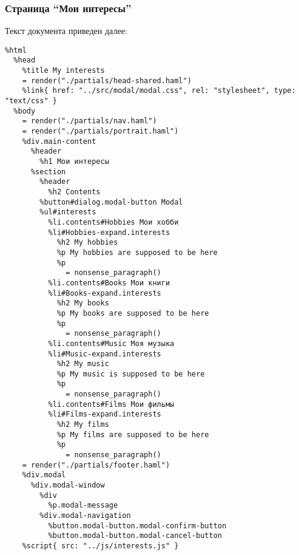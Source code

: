 \documentclass[a4paper,14pt]{extarticle}
\begin{document}
\subsubsection{Страница \enquote{Мои интересы}}
Текст документа  приведен далее:
\begin{lstlisting}
%html
  %head
    %title My interests
    = render("./partials/head-shared.haml")
    %link{ href: "../src/modal/modal.css", rel: "stylesheet", type: "text/css" }
  %body
    = render("./partials/nav.haml")
    = render("./partials/portrait.haml")
    %div.main-content
      %header
        %h1 Мои интересы
      %section
        %header
          %h2 Contents
        %button#dialog.modal-button Modal
        %ul#interests
          %li.contents#Hobbies Мои хобби
          %li#Hobbies-expand.interests
            %h2 My hobbies
            %p My hobbies are supposed to be here
            %p
              = nonsense_paragraph()
          %li.contents#Books Мои книги
          %li#Books-expand.interests
            %h2 My books
            %p My books are supposed to be here
            %p
              = nonsense_paragraph()
          %li.contents#Music Моя музыка
          %li#Music-expand.interests
            %h2 My music
            %p My music is supposed to be here
            %p
              = nonsense_paragraph()
          %li.contents#Films Мои фильмы
          %li#Films-expand.interests
            %h2 My films
            %p My films are supposed to be here
            %p
              = nonsense_paragraph()
    = render("./partials/footer.haml")
    %div.modal
      %div.modal-window
        %div
          %p.modal-message
        %div.modal-navigation
          %button.modal-button.modal-confirm-button
          %button.modal-button.modal-cancel-button
    %script{ src: "../js/interests.js" }
\end{lstlisting}
\end{document}
